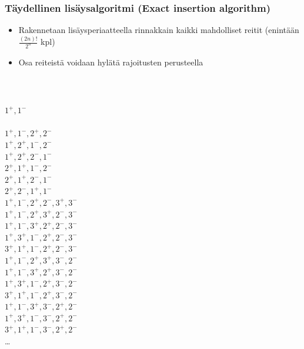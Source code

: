 \documentclass{beamer}
\begin{document}
    \begin{frame}
\frametitle{Täydellinen lisäysalgoritmi (Exact insertion algorithm)}
 \begin{itemize}
 \item
Rakennetaan lisäysperiaatteella rinnakkain kaikki mahdolliset reitit (enintään $\frac{(2n)!}{2^n}$ kpl)
\item
Osa reiteistä voidaan hylätä rajoitusten perusteella
\end{itemize}
\hfill \\
  \begin{columns}[c]
  \column{0.7in}
  \column{2.5in}  %
 $1^+,1^-$ \\
 \hfill \\
  $1^+,1^-,2^+,2^-$ \\
    $1^+,2^+,1^-,2^-$ \\
     $1^+,2^+,2^-,1^-$ \\
      $2^+,1^+,1^-,2^-$ \\
      $2^+,1^+,2^-,1^-$ \\
      $2^+,2^-,1^+,1^-$ \\
      \column{2.5in}
      {\tiny 
        $1^+,1^-,2^+,2^-,3^+,3^-$ \\
        $1^+,1^-,2^+,3^+,2^-,3^-$ \\
        $1^+,1^-,3^+,2^+,2^-,3^-$ \\
        $1^+,3^+,1^-,2^+,2^-,3^-$ \\
        $3^+,1^+,1^-,2^+,2^-,3^-$ \\
        
        $1^+,1^-,2^+,3^+,3^-,2^-$ \\
        $1^+,1^-,3^+,2^+,3^-,2^-$ \\
        $1^+,3^+,1^-,2^+,3^-,2^-$ \\
        $3^+,1^+,1^-,2^+,3^-,2^-$ \\
        
        $1^+,1^-,3^+,3^-,2^+,2^-$ \\
        $1^+,3^+,1^-,3^-,2^+,2^-$ \\
        $3^+,1^+,1^-,3^-,2^+,2^-$ \\
        
      \ldots
      }
      \end{columns}
\end{frame}
    
\end{document}
